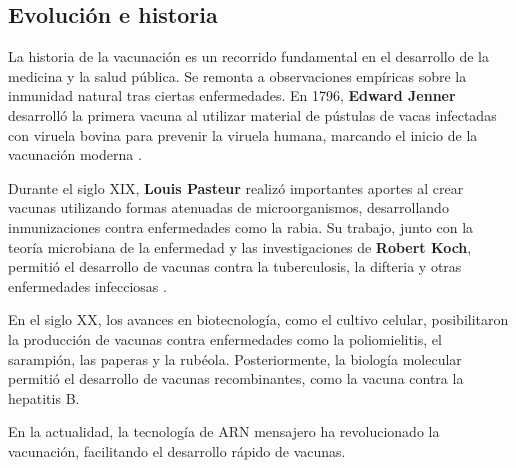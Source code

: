 \subsection{Evolución e historia}
La historia de la vacunación es un recorrido fundamental en el desarrollo de la medicina y la salud pública. Se remonta a observaciones empíricas sobre la inmunidad natural tras ciertas enfermedades. En 1796, \textbf{Edward Jenner} desarrolló la primera vacuna al utilizar material de pústulas de vacas infectadas con viruela bovina para prevenir la viruela humana, marcando el inicio de la vacunación moderna \cite{damaso2018revisiting}.

Durante el siglo XIX, \textbf{Louis Pasteur} realizó importantes aportes al crear vacunas utilizando formas atenuadas de microorganismos, desarrollando inmunizaciones contra enfermedades como la rabia. Su trabajo, junto con la teoría microbiana de la enfermedad y las investigaciones de \textbf{Robert Koch}, permitió el desarrollo de vacunas contra la tuberculosis, la difteria y otras enfermedades infecciosas \cite{schwartz2022pasteurian}.

En el siglo XX, los avances en biotecnología, como el cultivo celular, posibilitaron la producción de vacunas contra enfermedades como la poliomielitis, el sarampión, las paperas y la rubéola. Posteriormente, la biología molecular permitió el desarrollo de vacunas recombinantes, como la vacuna contra la hepatitis B.

En la actualidad, la tecnología de ARN mensajero ha revolucionado la vacunación, facilitando el desarrollo rápido de vacunas.





